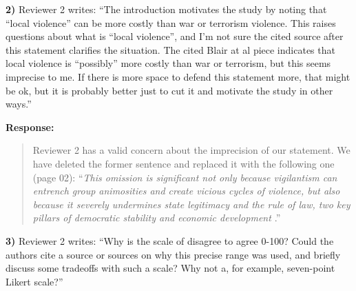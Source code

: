 \documentclass[a4paper,12pt]{article}
\begin{document}
\vspace{.3cm}

\noindent \textbf{2)} Reviewer 2 writes: ``The introduction motivates the study
by noting that ``local violence'' can be more costly than war or terrorism
violence. This raises questions about what is ``local violence'', and I'm not
sure the cited source after this statement clarifies the situation. The cited
Blair at al piece indicates that local violence is ``possibly'' more costly
than war or terrorism, but this seems imprecise to me. If there is more space
to defend this statement more, that might be ok, but it is probably better just
to cut it and motivate the study in other ways.''

\vspace{.3cm}

\noindent \textbf{Response:} 
\begin{quote}

Reviewer 2 has a valid concern about the imprecision of our statement. We have
deleted the former sentence and replaced it with the following one (page 02):
``\textit{This omission is significant not only because vigilantism can
  entrench group animosities and create vicious cycles of violence, but also
  because it severely undermines state legitimacy and the rule of law, two key
pillars of democratic stability and economic development
\citep{jung2020lynching, tankebe2009self}}.''

\end{quote}

\vspace{.3cm}

\noindent \textbf{3)} Reviewer 2 writes: ``Why is the scale of disagree to
agree 0-100? Could the authors cite a source or sources on why this precise
range was used, and briefly discuss some tradeoffs with such a scale? Why not
a, for example, seven-point Likert scale?''

\vspace{.3cm}
\end{document}

